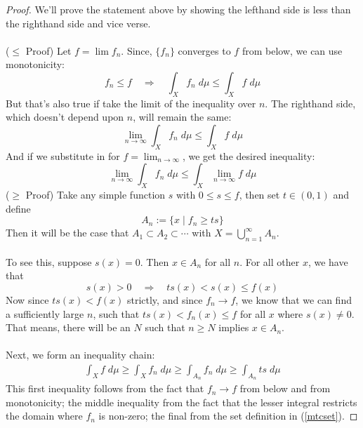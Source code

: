 \documentclass[12pt]{article}
\theoremstyle{plain}
\theoremstyle{definition}
\theoremstyle{remark}
\begin{document}
\begin{proof} We'll prove the statement above by showing the lefthand side is less than the righthand side and vice verse.
\\
\\
($\leq$ Proof) Let $f = \lim f_n$. Since, $\{f_n\}$ converges to $f$ from below, we can use monotonicity: 
\[
    f_n \leq f \quad \Rightarrow\quad
    \int_X f_n \; d\mu \leq \int_X f\; d\mu
\]
But that's also true if take the limit of the inequality over $n$. The righthand side, which doesn't depend upon $n$, will remain the same:
\[
    \lim_{n\rightarrow\infty}
    \int_X f_n \; d\mu \leq \int_X f\; d\mu
\]
And if we substitute in for $f=\lim_{n\rightarrow\infty}$, we get the desired inequality:
\[
    \lim_{n\rightarrow\infty}
    \int_X f_n \; d\mu 
    \leq \int_X \lim_{n\rightarrow\infty}f\; d\mu
\]
($\geq$ Proof) Take any simple function $s$ with $0\leq s\leq f$, then set $t\in(0,1)$ and define
\begin{equation}
    \label{mtcset}
    A_n := \{x \; |\; f_n \geq ts \}
\end{equation}
Then it will be the case that $A_1\subset A_2\subset \cdots$ with $X = \bigcup^\infty_{n=1} A_n$.
\\
\\
To see this, suppose $s(x)=0$. Then $x\in A_n$ for all $n$. For all other $x$, we have that
\[
    s(x)>0\quad\Rightarrow\quad ts(x)< s(x)\leq f(x)
\]
Now since $ts(x)<f(x)$ strictly, and since $f_n\rightarrow f$, we know that we can find a sufficiently large $n$, such that $ts(x)<f_n(x)\leq f$ for all $x$ where $s(x)\neq 0$. That means, there will be an $N$ such that $n\geq N$ implies $x\in A_n$.
\\
\\
Next, we form an inequality chain:
\begin{align}
    \label{ineqchain}
    \int_X f\;d\mu \geq \int_X f_n\;d\mu
    \geq \int_{A_n} f_n \;d\mu\geq \int_{A_n} ts \;d\mu
\end{align}
This first inequality follows from the fact that $f_n\rightarrow f$ from below and from monotonicity; the middle inequality from the fact that the lesser integral restricts the domain where $f_n$ is non-zero; the final from the set definition in (\ref{mtcset}).


\end{proof}
\end{document}
